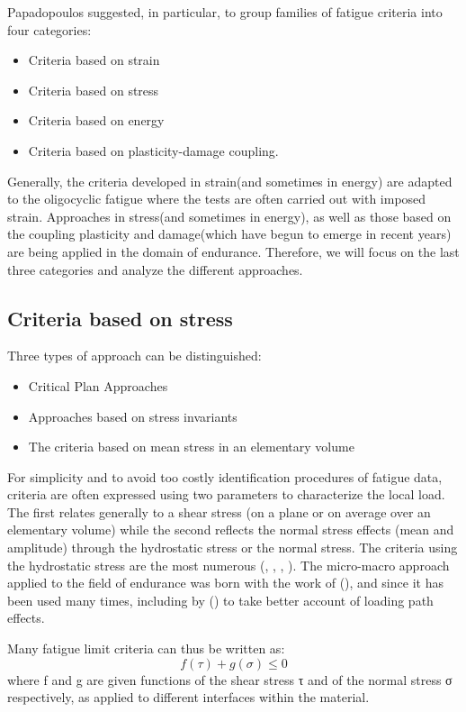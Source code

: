 Papadopoulos suggested, in particular, to group families of fatigue criteria into four categories:
\begin{itemize}
	\item Criteria based on strain
	\item Criteria based on stress
	\item Criteria based on energy
	\item Criteria based on plasticity-damage coupling.
\end{itemize}
Generally, the criteria developed in strain(and sometimes in energy) are adapted to the oligocyclic fatigue where the tests are often carried out with imposed strain. Approaches in stress(and sometimes in energy), as well as those based on the coupling plasticity and damage(which have begun to emerge in recent years) are being applied in the domain of endurance. Therefore, we will focus on the last three categories and analyze the different approaches.

\subsection{Criteria based on stress}
\vspace{6pt}

Three types of approach can be distinguished:
\begin{itemize}
	\item Critical Plan Approaches
	\item Approaches based on stress invariants
	\item The criteria based on mean stress in an elementary volume
\end{itemize}
For simplicity and to avoid too costly identification procedures of fatigue data, criteria are often expressed using two
parameters to characterize the local load. The first relates generally to a shear stress (on a plane or on average over an elementary volume) while
the second reflects the normal stress effects (mean and amplitude) through the hydrostatic stress or the normal stress.
The criteria using the hydrostatic stress are the most numerous (\cite{crossland1956effect}, \cite{sines1959behavior}, \cite{FFE:FFE452}, \cite{thu2008effet}). The micro-macro approach applied to the field of endurance was born with the work of (\cite{van1973khmu}), and since it has been used many times, including by (\cite{papadopoulos1993fatigue}) to take better account of loading path effects.


Many fatigue limit criteria can thus be written as:
\begin{equation}
f(\tau)+g(\sigma) \leqslant 0
\label{eq.generalfatigue}
\end{equation}
where f and g are given functions of the shear stress τ and of the normal stress σ respectively, as applied to different interfaces within the material.  


